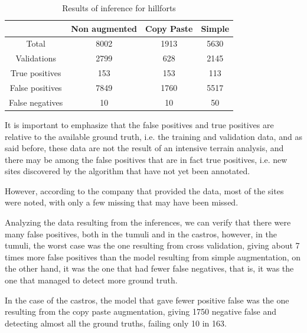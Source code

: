 \begin{table}[H]
\centering
\begin{tabular}{|c c c c|} 
 \hline
  & Non augmented  & Copy Paste & Simple \\ [0.5ex] 
 \hline\hline
 Total & 8002 & 1913 & 5630 \\ 
 Validations & 2799 & 628 & 2145\\
 True positives & 153 & 153 & 113 \\
 False positives & 7849 & 1760 & 5517 \\
 False negatives & 10 & 10 & 50\\ [1ex] 
 \hline
\end{tabular}
\caption{Results of inference for hillforts}
\end{table}
It is important to emphasize that the false positives and true positives are relative to the available ground truth, i.e. the training and validation data, and as said before, these data are not the result of an intensive terrain analysis, and there may be among the false positives that are in fact true positives, i.e. new sites discovered by the algorithm that have not yet been annotated.

However, according to the company that provided the data, most of the sites were noted, with only a few missing that may have been missed.

Analyzing the data resulting from the inferences, we can verify that there were many false positives, both in the tumuli and in the castros, however, in the tumuli, the worst case was the one resulting from cross validation, giving about 7 times more false positives than the model resulting from simple augmentation, on the other hand, it was the one that had fewer false negatives, that is, it was the one that managed to detect more ground truth.

In the case of the castros, the model that gave fewer positive false was the one resulting from the copy paste augmentation, giving 1750 negative false and detecting almost all the ground truths, failing only 10 in 163.